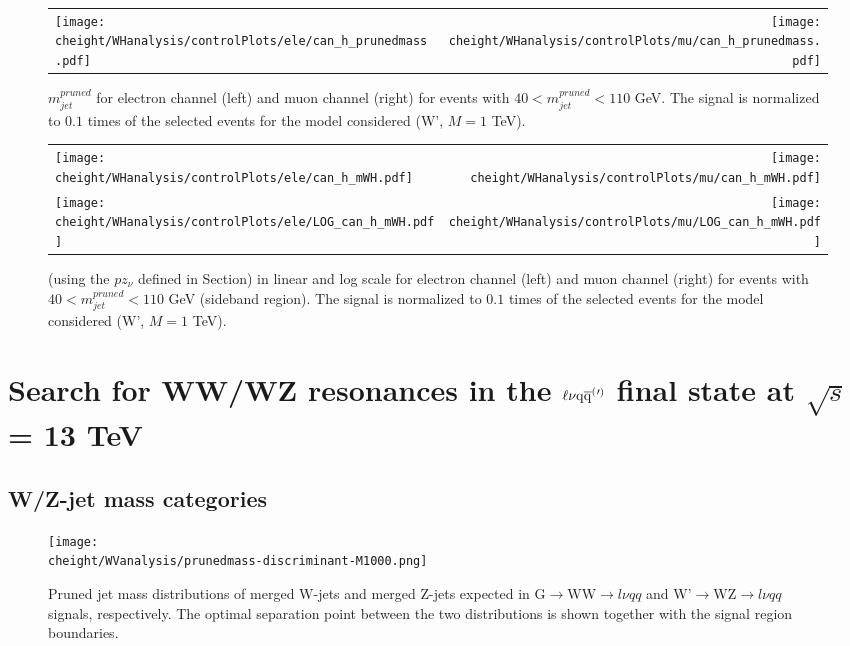 \begin{figure}[h!bp]
\centering
\begin{tabular}{lr}
\texttt{[image: \\cheight/WHanalysis/controlPlots/ele/can\_h\_prunedmass.pdf]} &
\texttt{[image: \\cheight/WHanalysis/controlPlots/mu/can\_h\_prunedmass.pdf]} \\
\end{tabular}
\caption{ $m_{jet}^{pruned}$ for electron channel (left) and muon channel (right) for events with $40 < m_{jet}^{pruned} < 110$ GeV. The signal is normalized to $0.1$ times of the selected events for the model considered (W', $M=1$ TeV).}
\label{fig:controlPlotsJetMass}
\end{figure}

\begin{figure}[h!bp]
\centering
\begin{tabular}{lr}
\texttt{[image: \\cheight/WHanalysis/controlPlots/ele/can\_h\_mWH.pdf]} &
\texttt{[image: \\cheight/WHanalysis/controlPlots/mu/can\_h\_mWH.pdf]} \\
\texttt{[image: \\cheight/WHanalysis/controlPlots/ele/LOG\_can\_h\_mWH.pdf]} &
\texttt{[image: \\cheight/WHanalysis/controlPlots/mu/LOG\_can\_h\_mWH.pdf]} \\
\end{tabular}
\caption{\mWH (using the $pz_\nu$ defined in Section) in linear and log scale for electron channel (left) and muon channel (right) for events with $40 < m_{jet}^{pruned} < 110$ GeV (sideband region). The signal is normalized to $0.1$ times of the selected events for the model considered (W', $M=1$ TeV).}
\label{fig:controlPlotsMWH}
\end{figure}

\section{Search for WW/WZ resonances in the $\ell\nu\mathrm{q}\overline{\mathrm{q}}^({}'^){}$ final state at $\sqrt{s}$ = 13 TeV}

\subsection{W/Z-jet mass categories}

\begin{figure}[htbp]
 \centering
 \texttt{[image: \\cheight/WVanalysis/prunedmass-discriminant-M1000.png]}
 \caption{Pruned jet mass distributions of merged W-jets and merged Z-jets expected in G$\rightarrow$WW$\rightarrow l\nu qq$ and W'$\rightarrow$WZ$\rightarrow l\nu qq$ signals, respectively. The optimal separation point between the two distributions is shown together with the signal region boundaries.}
 \label{fig:WZcategories}
 \end{figure}
 
